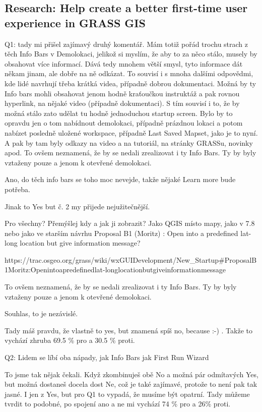 \documentclass[a4paper,10pt,twoside]{article}
\begin{document}
\newpage
\vspace*{-1cm}
\subsection{Research: Help create a better first-time user experience in GRASS GIS}

    Q1: tady mi přišel zajímavý druhý komentář. Mám totiž pořád trochu strach z těch Info Bars v Demolokaci, jelikož si myslím, že aby to za něco stálo, musely by obsahovat více informací. Dává tedy mnohem větší smysl, tyto informace dát někam jinam, ale dobře na ně odkázat. To souvisí i s mnoha dalšími odpovědmi, kde lidé navrhují třeba krátká videa, případně dobrou dokumentaci. Možná by ty Info bars mohli obsahovat jenom hodně kraťoučkou instruktáž a pak rovnou hyperlink, na nějaké video (případně dokumentaci).
    S tím souvisí i to, že by možná stálo zato udělat tu hodně jednoduchou startup screen. Bylo by to opravdu jen o tom nabídnout demolokaci, případně prázdnou lokaci a potom nabízet posledně uložené workspace, případně Last Saved Mapset, jako je to nyní. A pak by tam byly odkazy na video a na tutoriál, na stránky GRASSu, novinky apod. To ovšem neznamená, že by se nedali zrealizovat i ty Info Bars. Ty by byly vztaženy pouze a jenom k otevřené demolokaci.
    
    Ano, do těch info bars se toho moc nevejde, takže nějaké Learn more bude potřeba.

Jinak to Yes but č. 2 my přijede nejužitečnější.

Pro všechny? Přemýšlej kdy a jak ji zobrazit? Jako QGIS místo mapy, jako v 7.8 nebo jako ve starším návrhu Proposal B1 (Moritz) : Open into a predefined lat-long location but give information message?

https://trac.osgeo.org/grass/wiki/wxGUIDevelopment/New\_Startup\#ProposalB1Moritz:Openintoapredefinedlat-longlocationbutgiveinformationmessage

        To ovšem neznamená, že by se nedali zrealizovat i ty Info Bars. Ty by byly vztaženy pouze a jenom k otevřené demolokaci.

Souhlas, to je nezávislé.

 Tady máš pravdu, že vlastně to yes, but znamená spíš no, because :-) . Takže to vychází zhruba 69.5 \% pro a 30.5 \% proti.



    Q2: Lidem se líbí oba nápady, jak Info Bars jak First Run Wizard
    
    To jsme tak nějak čekali. Když zkombinuješ obě No a možná pár odmítavých Yes, but možná dostaneš docela dost Ne, což je také zajímavé, protože to není pak tak jasné. I jen z Yes, but pro Q1 to vypadá, že musíme být opatrní.
    Tady můžeme tvrdit to podobné, po spojení ano a ne mi vychází 74 \% pro a 26\% proti. 
\end{document}

